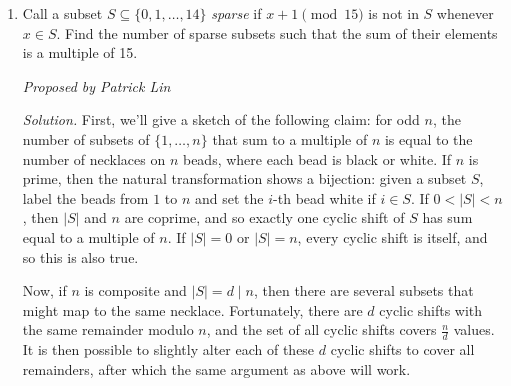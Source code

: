 \documentclass[10pt]{article}
\newcommand{\abs}[1]{\lvert #1 \rvert}
\newcommand{\proposed}[1]
{
\vspace{5pt}
\noindent\textit{Proposed by #1}
}
\newcommand{\solution}
{
\vspace{5pt}
\noindent\textit{Solution.}\qquad
}
\begin{document}
\begin{enumerate}
\begin{proof}
Note that any such permutation clearly works; in particular, the unique $k$ satisfying the requested property is $k=b_\ell$, since then $\sigma(b_\ell) = b_1 > b_\ell$.  Now consider any permutation $\sigma$ satisfying the above property.  Remark that the cycle decomposition of $\sigma$ must contain only one cycle.  This is because every cycle contributes at least one value of $k$ for which $\sigma(k) > k$, since otherwise writing the elements in the cycle as $c_1,\ldots, c_m$ we would have \[c_1 > c_2 > \cdots > c_m > c_1,\] which is clearly not possible.  In particular, this cycle must be the one containing $k$.  Similar logic as above shows that the remaining elements of the cycle must be sorted in decreasing order, and so we are done.
\end{proof}

With this observation, the problem becomes easy.  Every such permutation bijects to a unique subset $S\subseteq [2018]$ with $|S|\geq 2$, since the permutation depends only on the set of elements which make up the cycle.  Thus, the requested answer is the number of subsets of $[2018]$ which have at least $2$ elements, or $\boxed{2^{2018} - 2019}$.

\item Call a subset $S \subseteq \{0,1,\dots,14\}$ \textit{sparse} if $x+1 \pmod{15}$ is not in $S$ whenever $x \in S$. Find the number of sparse subsets such that the sum of their elements is a multiple of 15.

\proposed{Patrick Lin}

\solution First, we'll give a sketch of the following claim: for odd $n$, the number of subsets of $\{1,\dots,n\}$ that sum to a multiple of $n$ is equal to the number of necklaces on $n$ beads, where each bead is black or white. If $n$ is prime, then the natural transformation shows a bijection: given a subset $S$, label the beads from $1$ to $n$ and set the $i$-th bead white if $i \in S$. If $0 < \abs{S} < n$, then $\abs{S}$ and $n$ are coprime, and so exactly one cyclic shift of $S$ has sum equal to a multiple of $n$. If $\abs{S} = 0$ or $\abs{S} = n$, every cyclic shift is itself, and so this is also true.

\par Now, if $n$ is composite and $\abs{S} = d \mid n$, then there are several subsets that might map to the same necklace. Fortunately, there are $d$ cyclic shifts with the same remainder modulo $n$, and the set of all cyclic shifts covers $\tfrac{n}{d}$ values. It is then possible to slightly alter each of these $d$ cyclic shifts to cover all remainders, after which the same argument as above will work.


\end{enumerate}
\end{document}
